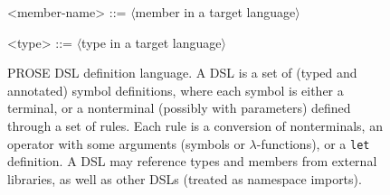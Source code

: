 \begin{figure}[p!]
\begin{tcolorbox}
\begin{grammar}
        <member-name> ::= $\langle$\textup{member in a target language}$\rangle$

        <type> ::=  $\langle$\textup{type in a target language}$\rangle$
    \end{grammar}
    \end{tcolorbox}
    \caption{PROSE DSL definition language.
        A DSL is a set of (typed and annotated) symbol definitions, where each symbol is either a terminal, or a
        nonterminal (possibly with parameters) defined through a set of rules.
        Each rule is a conversion of nonterminals, an operator with some arguments (symbols or $\lambda$-functions), or
        a \texttt{let} definition.
        A DSL may reference types and members from external libraries, as well as other DSLs (treated as namespace
        imports).
    }
    \label{fig:dsldefinition}
\end{figure}
